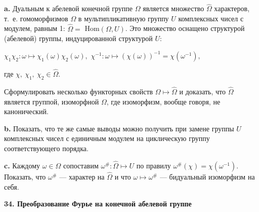 \documentclass{mai_book}
\begin{document}
\medskip
\textbf{a.} Дуальным к абелевой конечной группе $\Omega$ является множество $\hat{\Omega}$ характеров, т.~е. гомоморфизмов $\Omega$ в мультипликативную группу $U$ комплексных чисел с модулем, равным 1: $\hat{\Omega} =$ Hom$(\Omega , U)$. Это множество оснащено структурой (абелевой) группы, индуцированной структурой $U$:
\begin{center}
  $\chi_1 \chi_2 : \omega \mapsto \chi_1 (\omega) \chi_2 (\omega),$ $\chi^{-1} : \omega \mapsto (\chi (\omega))^{-1} = \chi(\omega^{-1}),$\par
  где $\chi,\ \chi_1,\ \chi_2 \in \hat{\Omega}.$
\end{center}
\noindent
Сформулировать несколько функторных свойств $\Omega \mapsto \hat{\Omega}$ и доказать, что $\hat{\Omega}$ является группой, изоморфной $\Omega$, где изоморфизм, вообще говоря, не канонический.\par
\textbf{b.} Показать, что те же самые выводы можно получить при замене группы $U$ комплексных чисел с единичным модулем на циклическую группу соответствующего порядка. \par
\textbf{c.} Каждому $ \omega \in \Omega$ сопоставим $\omega^{\#} : \hat{\Omega} \mapsto U$ по правилу $\omega^{\#}(\chi)=\chi (\omega^{-1})$. Показать, что $\omega^{\#}$ --- характер на $\hat{\Omega}$ и что $\omega \mapsto \omega^{\#}$ --- бидуальный изоморфизм на себя.\newpage

\medskip
\noindent
\textbf{34. Преобразование Фурье на конечной абелевой группе}
\end{document}
